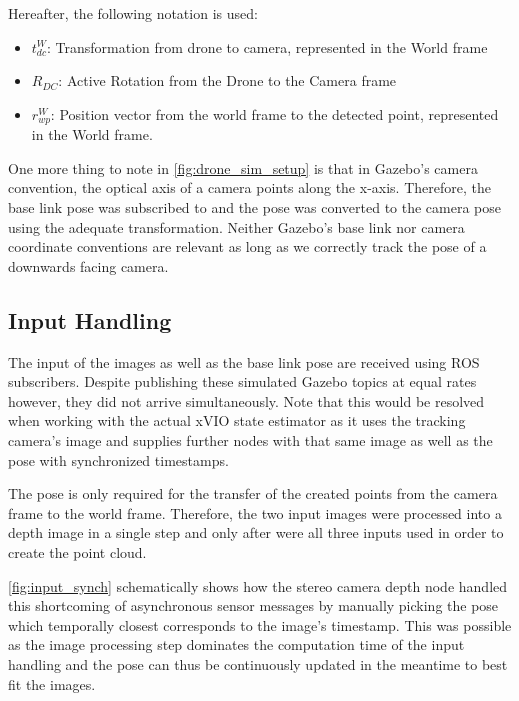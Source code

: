 Hereafter, the following notation is used:

\begin{itemize}
    \item $t_{dc}^W$: Transformation from drone to camera, represented in the World frame
    \item $R_{DC}$: Active Rotation from the Drone to the Camera frame
    \item $r_{wp}^W$: Position vector from the world frame to the detected point, represented in the World frame.
\end{itemize}

One more thing to note in \cref{fig:drone_sim_setup} is that in Gazebo's camera convention, the optical axis of a camera points along the x-axis. Therefore, the base link pose was subscribed to and the pose was converted to the camera pose using the adequate transformation. Neither Gazebo's base link nor camera coordinate conventions are relevant as long as we correctly track the pose of a downwards facing camera.

\subsection{Input Handling}
The input of the images as well as the base link pose are received using ROS subscribers. Despite publishing these simulated Gazebo topics at equal rates however, they did not arrive simultaneously. Note that this would be resolved when working with the actual xVIO state estimator as it uses the tracking camera's image and supplies further nodes with that same image as well as the pose with synchronized timestamps.

The pose is only required for the transfer of the created points from the camera frame to the world frame. Therefore, the two input images were processed into a depth image in a single step and only after were all three inputs used in order to create the point cloud. 

\cref{fig:input_synch} schematically shows how the stereo camera depth node handled this shortcoming of asynchronous sensor messages by manually picking the pose which temporally closest corresponds to the image's timestamp. This was possible as the image processing step dominates the computation time of the input handling and the pose can thus be continuously updated in the meantime to best fit the images.

